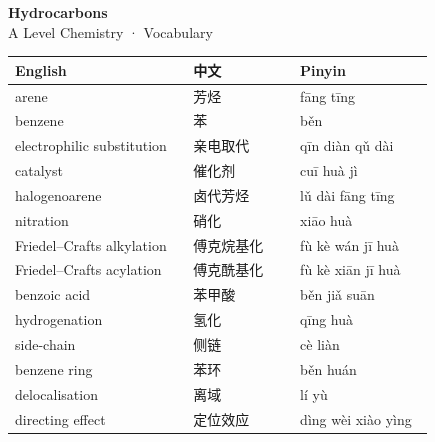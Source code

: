 \documentclass[11pt]{article}
\begin{document}
\begin{center}
  {\LARGE\bfseries Hydrocarbons}\\[0.35em]
  {\large A Level Chemistry · Vocabulary}
\end{center}
\vspace{0.6em}

\begin{longtable}{@{}p{0.40\linewidth}p{0.24\linewidth}p{0.30\linewidth}@{}}
\toprule
\textbf{English} & \textbf{中文} & \textbf{Pinyin} \\
\midrule
\endhead
\bottomrule
\endlastfoot
arene & 芳烃 & fāng tīng \\
benzene & 苯 & běn \\
electrophilic substitution & 亲电取代 & qīn diàn qǔ dài \\
catalyst & 催化剂 & cuī huà jì \\
halogenoarene & 卤代芳烃 & lǔ dài fāng tīng \\
nitration & 硝化 & xiāo huà \\
Friedel–Crafts alkylation & 傅克烷基化 & fù kè wán jī huà \\
Friedel–Crafts acylation & 傅克酰基化 & fù kè xiān jī huà \\
benzoic acid & 苯甲酸 & běn jiǎ suān \\
hydrogenation & 氢化 & qīng huà \\
side-chain & 侧链 & cè liàn \\
benzene ring & 苯环 & běn huán \\
delocalisation & 离域 & lí yù \\
directing effect & 定位效应 & dìng wèi xiào yìng \\
\end{longtable}
\end{document}
